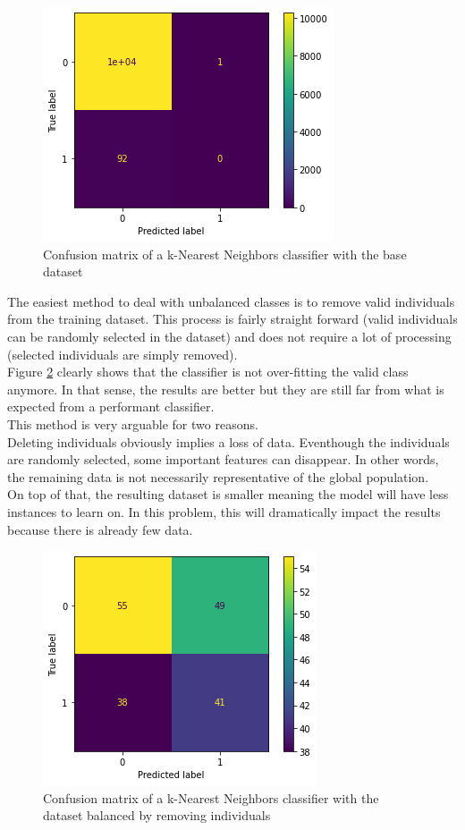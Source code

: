 \begin{figure}
    \center
    \includegraphics[scale=.5]{img/data_preparation_1.png}
    \caption{Confusion matrix of a k-Nearest Neighbors classifier with the base dataset}
    \label{data_preparation_1}
\end{figure}

The easiest method to deal with unbalanced classes is to remove valid individuals from the training dataset. This process is fairly straight forward (valid individuals can be randomly selected in the dataset) and does not require a lot of processing (selected individuals are simply removed).\\
Figure \ref{data_preparation_2} clearly shows that the classifier is not over-fitting the valid class anymore. In that sense, the results are better but they are still far from what is expected from a performant classifier.\\
This method is very arguable for two reasons.\\
Deleting individuals obviously implies a loss of data. Eventhough the individuals are randomly selected, some important features can disappear. In other words, the remaining data is not necessarily representative of the global population.\\
On top of that, the resulting dataset is smaller meaning the model will have less instances to learn on. In this problem, this will dramatically impact the results because there is already few data.\\

\begin{figure}
    \center
    \includegraphics[scale=.5]{img/data_preparation_2.png}
    \caption{Confusion matrix of a k-Nearest Neighbors classifier with the dataset balanced by removing individuals}
    \label{data_preparation_2}
\end{figure}

